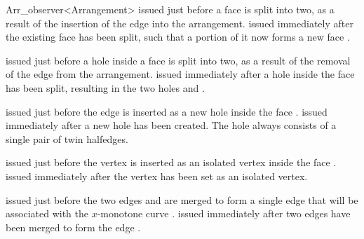 \begin{ccRefClass}{Arr_observer<Arrangement>}
    {issued just before a face  is split into two, as a result of
     the insertion of the edge  into the arrangement.}
\ccGlue
{}
    {issued immediately after the existing face  has been split,
     such that a portion of it now forms a new face .}

    {issued just before a hole  inside a face  is split into
     two, as a result of the removal of the edge  from the arrangement.}
\ccGlue
{}
    {issued immediately after a hole inside the face  has been split,
     resulting in the two holes  and .}

    {issued just before the edge  is inserted as a new hole inside
     the face .}
\ccGlue
{}
    {issued immediately after a new hole  has been created. The hole
     always consists of a single pair of twin halfedges.}

    {issued just before the vertex  is inserted as an isolated
     vertex inside the face .}
\ccGlue
{}
    {issued immediately after the vertex  has been set as an
     isolated vertex.}

    {issued just before the two edges  and  are merged to
     form a single edge that will be associated with the $x$-monotone curve
     .}
\ccGlue
{}
    {issued immediately after two edges have been merged to form the edge
     .}


\end{ccRefClass}
